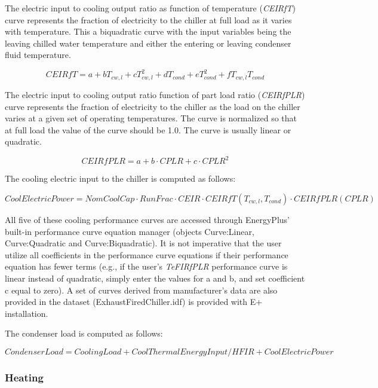 The electric input to cooling output ratio as function of temperature (\emph{CEIRfT}) curve represents the fraction of electricity to the chiller at full load as it varies with temperature. This a biquadratic curve with the input variables being the leaving chilled water temperature and either the entering or leaving condenser fluid temperature.

\begin{equation}
CEIRfT = a + b{T_{cw,l}} + cT_{cw,l}^2 + d{T_{cond}} + eT_{cond}^2 + f{T_{cw,l}}{T_{cond}}
\end{equation}

The electric input to cooling output ratio function of part load ratio (\emph{CEIRfPLR}) curve represents the fraction of electricity to the chiller as the load on the chiller varies at a given set of operating temperatures. The curve is normalized so that at full load the value of the curve should be 1.0. The curve is usually linear or quadratic.

\begin{equation}
CEIRfPLR = a + b \cdot CPLR + c \cdot CPL{R^2}
\end{equation}

The cooling electric input to the chiller is computed as follows:

\begin{equation}
CoolElectricPower = NomCoolCap \cdot RunFrac \cdot CEIR \cdot CEIRfT\left( {{T_{cw,l}},{T_{cond}}} \right) \cdot CEIRfPLR(CPLR)
\end{equation}

All five of these cooling performance curves are accessed through EnergyPlus' built-in performance curve equation manager (objects Curve:Linear, Curve:Quadratic and Curve:Biquadratic). It is not imperative that the user utilize all coefficients in the performance curve equations if their performance equation has fewer terms (e.g., if the user's \emph{TeFIRfPLR} performance curve is linear instead of quadratic, simply enter the values for a and b, and set coefficient c equal to zero). A set of curves derived from manufacturer's data are also provided in the dataset (ExhaustFiredChiller.idf) is provided with E+ installation.

The condenser load is computed as follows:

\begin{equation}
CondenserLoad = CoolingLoad + CoolThermalEnergyInput/HFIR + CoolElectricPower
\end{equation}

\subsubsection{Heating}\label{heating-1}

